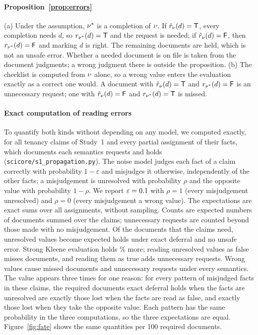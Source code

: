 \paragraph{Proposition~\ref{prop:errors}}
(a) Under the assumption, $\nu^\ast$ is a completion of $\nu$. If $\hat r_\nu(d)=\mathsf{T}$, every completion needs $d$, so $r_{\nu^\ast}(d)=\mathsf{T}$ and the request is needed; if $\hat r_\nu(d)=\mathsf{F}$, then $r_{\nu^\ast}(d)=\mathsf{F}$ and marking $d$ \skipd is right. The remaining documents are held, which is not an unsafe error. Whether a needed document is on file is taken from the document judgments; a wrong judgment there is outside the proposition. (b) The checklist is computed from $\nu$ alone, so a wrong value enters the evaluation exactly as a correct one would. A document with $\hat r_\nu(d)=\mathsf{T}$ and $r_{\nu^\ast}(d)=\mathsf{F}$ is an unnecessary request; one with $\hat r_\nu(d)=\mathsf{F}$ and $r_{\nu^\ast}(d)=\mathsf{T}$ is missed.

\paragraph{Exact computation of reading errors}
To quantify both kinds without depending on any model, we computed exactly, for all \propClaims{} tenancy claims of Study~1 and every partial assignment of their facts, which documents each semantics requests and holds (\texttt{scicore/\allowbreak{}s1\_\allowbreak{}propagation.py}). The noise model judges each fact of a claim correctly with probability $1-\varepsilon$ and misjudges it otherwise, independently of the other facts; a misjudgement is unresolved with probability $\rho$ and the opposite value with probability $1-\rho$. We report $\varepsilon=0.1$ with $\rho=1$ (every misjudgement unresolved) and $\rho=0$ (every misjudgement a wrong value). The expectations are exact sums over all assignments, without sampling. Counts are expected numbers of documents summed over the claims; unnecessary requests are counted beyond those made with no misjudgement. Of the \propRequired{} documents that the claims need, unresolved values become \propExactDefer{} expected holds under exact deferral and no unsafe error. Strong Kleene evaluation holds \propKleeneExtra\% more; reading unresolved values as false misses \propClosedMiss{} documents, and reading them as true adds \propEagerUnnec{} unnecessary requests. Wrong values cause \propFlipMiss{} missed documents and \propFlipUnnec{} unnecessary requests under every semantics. The value \propExactDefer{} appears three times for one reason: for every pattern of misjudged facts in these claims, the required documents exact deferral holds when the facts are unresolved are exactly those lost when the facts are read as false, and exactly those lost when they take the opposite value. Each pattern has the same probability in the three computations, so the three expectations are equal. Figure~\ref{fig:fate} shows the same quantities per 100 required documents.

